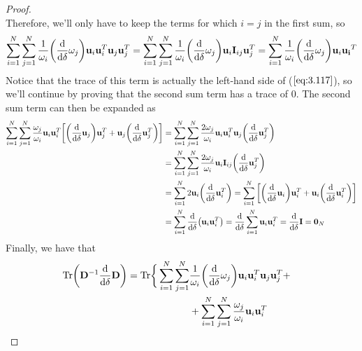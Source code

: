 \begin{proof}
\begin{equation*}
        \label{eq:C.33}\tag{C.33}
    \end{equation*}
    Therefore, we'll only have to keep the terms for which $i = j$ in 
    the first sum, so
    \[
        \sum_{i=1}^{N} \sum_{j=1}^{N}  
            \frac{1}{\omega_i} \bigg(\dv{\delta}\omega_j\bigg) \mathbf{u}_i\mathbf{u}_i^T 
            \mathbf{u}_j\mathbf{u}_j^T  
        =
        \sum_{i=1}^{N} \sum_{j=1}^{N}  
        \frac{1}{\omega_i} \bigg(\dv{\delta}\omega_j\bigg) \mathbf{u}_i\mathbf{I}_{ij} 
            \mathbf{u}_j^T  
        = \sum_{i=1}^{N} \frac{1}{\omega_i}
        \bigg(\dv{\delta}\omega_j\bigg) \mathbf{u}_i\mathbf{u_i}^T
    \] 
    Notice that the trace of this term is actually the left-hand side
    of ($\ref{eq:3.117}$), so we'll continue by proving that the second 
    sum term has a trace of 0. The second sum term can then be expanded as
    \begin{align*}
        \sum_{i=1}^{N} \sum_{j=1}^{N} \frac{\omega_j}{\omega_i} \mathbf{u}_i\mathbf{u}_i^T 
        \bigg[\bigg(\dv{\delta} \mathbf{u}_j\bigg)\mathbf{u}_j^T
        + \mathbf{u}_j\bigg(\dv{\delta}\mathbf{u}_j^T\bigg)\bigg] 
        &= \sum_{i=1}^{N} \sum_{j=1}^{N} \frac{2\omega_j}{\omega_i} \mathbf{u}_i\mathbf{u}_i^T
        \mathbf{u}_j\bigg(\dv{\delta}\mathbf{u}_j^T\bigg) \\
        &= \sum_{i=1}^{N} \sum_{j=1}^{N} \frac{2\omega_j}{\omega_i} \mathbf{u}_i\mathbf{I}_{ij}
        \bigg(\dv{\delta}\mathbf{u}_j^T\bigg)\\
        &= \sum_{i=1}^{N} 2\mathbf{u}_i\bigg(\dv{\delta} \mathbf{u}_i^T\bigg) 
        = \sum_{i=1}^{N} \bigg[\bigg(\dv{\delta}\mathbf{u}_i\bigg)\mathbf{u}_i^T 
        + \mathbf{u}_i\bigg(\dv{\delta}\mathbf{u}_i^T\bigg)\bigg] \\
        &= \sum_{i=1}^{N} \dv{\delta} (\mathbf{u}_i\mathbf{u}_i^T) 
        = \dv{\delta}\sum_{i=1}^{N} \mathbf{u}_i\mathbf{u}_i^T 
        = \dv{\delta}\mathbf{I} 
        = \mathbf{0}_N
    \end{align*}
    Finally, we have that
    \begin{align*}
        \text{Tr}\bigg(\mathbf{D}^{-1}\dv{\delta}\mathbf{D}\bigg)
        &= \begin{aligned}[t] 
            \text{Tr}\bigg\{\sum_{i=1}^{N} \sum_{j=1}^{N} & 
                \frac{1}{\omega_i} \bigg(\dv{\delta}\omega_j\bigg) \mathbf{u}_i\mathbf{u}_i^T 
                \mathbf{u}_j\mathbf{u}_j^T + \\
                &+ \sum_{i=1}^{N} \sum_{j=1}^{N} \frac{\omega_j}{\omega_i} \mathbf{u}_i\mathbf{u}_i^T

\end{aligned}
\end{align*}
\end{proof}
